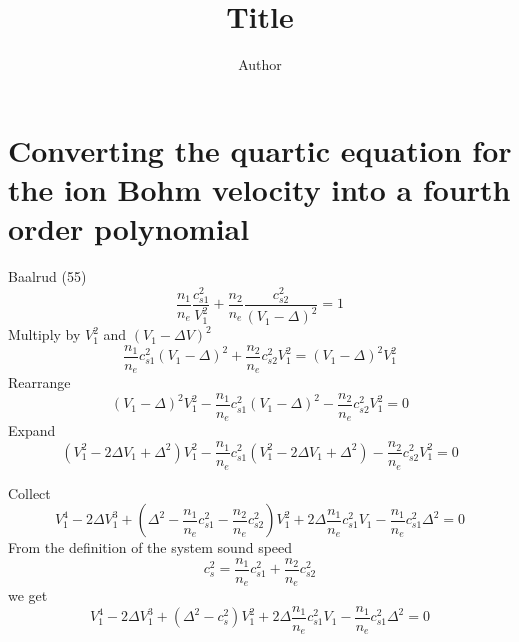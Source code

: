 \documentclass[12pt]{article}%
\begin{document}
\title{Title}
\author{Author}
\maketitle

\section{Converting the quartic equation for the ion Bohm velocity into a
fourth order polynomial}

Baalrud (55)%
\begin{equation}
\frac{n_{1}}{n_{e}}\frac{c_{s1}^{2}}{V_{1}^{2}}+\frac{n_{2}}{n_{e}}%
\frac{c_{s2}^{2}}{\left(  V_{1}-\Delta\right)  ^{2}}=1
\end{equation}
Multiply by $V_{1}^{2}$ and $\left(  V_{1}-\Delta V\right)  ^{2}$%
\begin{equation}
\frac{n_{1}}{n_{e}}c_{s1}^{2}\left(  V_{1}-\Delta\right)  ^{2}+\frac{n_{2}%
}{n_{e}}c_{s2}^{2}V_{1}^{2}=\left(  V_{1}-\Delta\right)  ^{2}V_{1}^{2}%
\end{equation}
Rearrange%
\begin{equation}
\left(  V_{1}-\Delta\right)  ^{2}V_{1}^{2}-\frac{n_{1}}{n_{e}}c_{s1}%
^{2}\left(  V_{1}-\Delta\right)  ^{2}-\frac{n_{2}}{n_{e}}c_{s2}^{2}V_{1}^{2}=0
\end{equation}
Expand%
\begin{equation}
\left(  V_{1}^{2}-2\Delta V_{1}+\Delta^{2}\right)  V_{1}^{2}-\frac{n_{1}%
}{n_{e}}c_{s1}^{2}\left(  V_{1}^{2}-2\Delta V_{1}+\Delta^{2}\right)
-\frac{n_{2}}{n_{e}}c_{s2}^{2}V_{1}^{2}=0
\end{equation}


Collect%
\begin{equation}
V_{1}^{4}-2\Delta V_{1}^{3}+\left(  \Delta^{2}-\frac{n_{1}}{n_{e}}c_{s1}%
^{2}-\frac{n_{2}}{n_{e}}c_{s2}^{2}\right)  V_{1}^{2}+2\Delta\frac{n_{1}}%
{n_{e}}c_{s1}^{2}V_{1}-\frac{n_{1}}{n_{e}}c_{s1}^{2}\Delta^{2}=0
\end{equation}
From the definition of the system sound speed%
\begin{equation}
c_{s}^{2}=\frac{n_{1}}{n_{e}}c_{s1}^{2}+\frac{n_{2}}{n_{e}}c_{s2}^{2}%
\end{equation}
we get%
\begin{equation}
V_{1}^{4}-2\Delta V_{1}^{3}+\left(  \Delta^{2}-c_{s}^{2}\right)  V_{1}%
^{2}+2\Delta\frac{n_{1}}{n_{e}}c_{s1}^{2}V_{1}-\frac{n_{1}}{n_{e}}c_{s1}%
^{2}\Delta^{2}=0
\end{equation}




\end{document}
